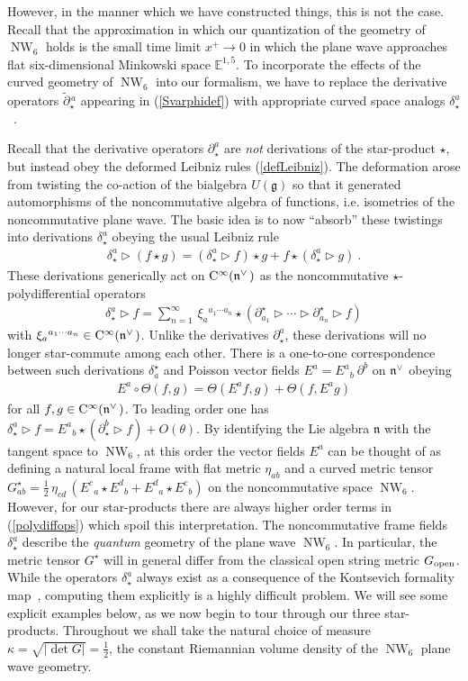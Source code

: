 \documentclass[11pt,a4paper]{article}
\DeclareMathOperator{\NW}{NW}
\newcommand{\1}{\mathbb{1}}
\def\CC{{\rm C}}
\def\mfn{{\mathfrak n}}
\def\mfg{{\mathfrak g}}
\newcommand{\eucl}{{\mathbb E}}
\newcommand{\beq}{\begin{eqnarray}}
\newcommand{\eeq}{\end{eqnarray}}
\begin{document}
However, in the manner which we have constructed things, this is not
the case. Recall that the approximation in which our quantization of
the geometry of $\NW_6$ holds is the small time limit $x^+\to0$ in
which the plane wave approaches flat six-dimensional Minkowski space
$\eucl^{1,5}$. To incorporate the effects of the curved geometry of
$\NW_6$ into our formalism, we have to replace the derivative
operators $\widetilde{\partial}{}_\star^{\,a}$ appearing in
(\ref{Svarphidef}) with appropriate curved space analogs
$\delta_\star^a$~\cite{BehrSyk1,HoMiao1}.

Recall that the derivative operators $\partial_\star^{a}$ are {\it
  not} derivations of the star-product $\star$, but instead obey the
deformed Leibniz rules (\ref{defLeibniz}). The deformation arose from
twisting the co-action of the bialgebra $U(\mfg)$ so that it generated
automorphisms of the noncommutative algebra of functions,
i.e. isometries of the noncommutative plane wave. The basic idea is to
now ``absorb'' these twistings into derivations $\delta_\star^a$
obeying the usual Leibniz rule
\beq
\delta_\star^a\triangleright(f\star g)=\left(\delta_\star^a
\triangleright f\right)\star g+f\star\left(\delta_\star^a
\triangleright g\right) \ .
\label{deltaLeibniz}\eeq
These derivations generically act on $\CC^\infty(\mfn^{\vee\,})$ as the
noncommutative $\star$-polydifferential operators
\beq
\delta_\star^a\triangleright f=\sum_{n=1}^\infty\,\xi_a{}^{a_1\cdots
  a_n}\star\left(\partial_{a_1}^\star\triangleright\cdots\triangleright
\partial_{a_n}^\star\triangleright f\right)
\label{polydiffops}\eeq
with $\xi_a{}^{a_1\cdots a_n}\in\CC^\infty(\mfn^{\vee\,})$. Unlike the
derivatives $\partial_\star^a$, these derivations will no longer
star-commute among each other. There is a one-to-one
correspondence~\cite{Kont1} between such derivations $\delta_a^\star$
and Poisson vector fields $E^a=E^a{}_b~\partial^b$ on $\mfn^{\vee\,}$
obeying
\beq
E^a\circ\Theta(f,g)=\Theta(E^af,g)+\Theta(f,E^ag)
\label{Poissonvecfields}\eeq
for all $f,g\in\CC^\infty(\mfn^{\vee\,})$. To leading order one has
$\delta_\star^a\triangleright
f=E^a{}_b\star(\partial_\star^b\triangleright f)+O(\theta)$. By
identifying the Lie algebra $\mfn$ with the tangent space to $\NW_6$,
at this order the vector fields $E^a$ can be thought of as defining a
natural local frame with flat metric $\eta_{ab}$ and a curved metric tensor
$G^\star_{ab}=\frac12\,\eta_{cd}\,(E^c{}_a\star E^d{}_b+E^d{}_a\star
E^c{}_b)$ on the noncommutative space $\NW_6$. However, for our
star-products there are always higher order terms in
(\ref{polydiffops}) which spoil this interpretation. The
noncommutative frame fields $\delta_\star^a$ describe the {\it
  quantum} geometry of the plane wave $\NW_6$. In particular, the
metric tensor $G^\star$ will in general differ from the
classical open string metric $G_{\rm open}$. While the operators
$\delta_\star^a$ always exist as a consequence of the Kontsevich
formality map~\cite{Kont1,BehrSyk1}, computing them explicitly is a
highly difficult problem. We will see some explicit examples below, as
we now begin to tour through our three star-products. Throughout we
shall take the natural choice of measure $\kappa=\sqrt{|\det
  G|}=\frac12$, the constant Riemannian volume density of the $\NW_6$
plane wave geometry.
\end{document}
